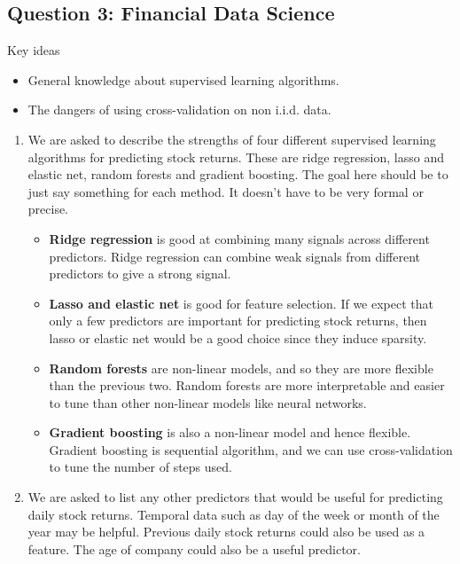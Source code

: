 \subsection*{Question 3: Financial Data Science}
Key ideas
\begin{itemize}
    \item General knowledge about supervised learning algorithms.
    \item The dangers of using cross-validation on non i.i.d. data.
\end{itemize}
\begin{enumerate}[label = (\alph*)]
    \item We are asked to describe the strengths of four different supervised learning algorithms for predicting stock returns. These are ridge regression, lasso and elastic net, random forests and gradient boosting.  The goal here should be to just say something for each method. It doesn't have to be very formal or precise. 
    \begin{itemize}
        \item \textbf{Ridge regression} is good at combining many signals across different predictors. Ridge regression can combine weak signals from different predictors to give a strong signal.
        \item \textbf{Lasso and elastic net} is good for feature selection. If we expect that only a few predictors are important for predicting stock returns, then lasso or elastic net would be a good choice since they induce sparsity.
        \item \textbf{Random forests} are non-linear models, and so they are more flexible than the previous two. Random forests are more interpretable and easier to tune than other non-linear models like neural networks.
        \item \textbf{Gradient boosting} is also a non-linear model and hence flexible. Gradient boosting is sequential algorithm, and we can use cross-validation to tune the number of steps used.
    \end{itemize}
    \item We are asked to list any other predictors that would be useful for predicting daily stock returns. Temporal data such as day of the week or month of the year may be helpful. Previous daily stock returns could also be used as a feature. The age of company could also be a useful predictor.
    

\end{enumerate}
